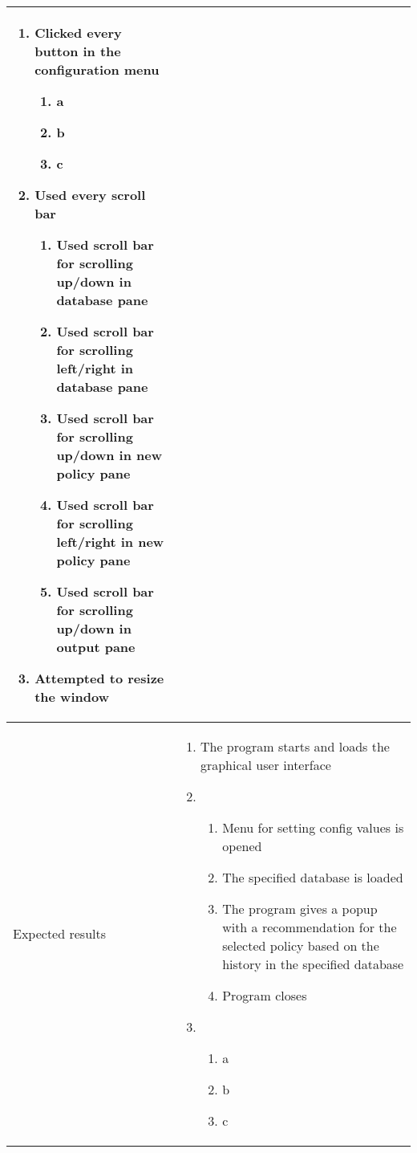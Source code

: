 \begin{center}
\begin{longtable}{ | p{4cm} | p{10cm} | }
\begin{enumerate}
							\item Clicked every button in the configuration menu
							\begin{enumerate}
								\item a
								\item b
								\item c
							\end{enumerate}

							\item Used every scroll bar
							\begin{enumerate}
								\item Used scroll bar for scrolling up/down in database pane
								\item Used scroll bar for scrolling left/right in database pane
								\item Used scroll bar for scrolling up/down in new policy pane
								\item Used scroll bar for scrolling left/right in new policy pane
								\item Used scroll bar for scrolling up/down in output pane
							\end{enumerate}

							\item Attempted to resize the window
						\end{enumerate} \\ [3pt] \hline
			
			Expected results &	\begin{enumerate}
							\item The program starts and loads the graphical user interface

							\item  
							\begin{enumerate}
								\item Menu for setting config values is opened
								\item The specified database is loaded
								\item The program gives a popup with a recommendation for the selected policy based on the history in the specified database
								\item Program closes
							\end{enumerate}
							
							\item
							\begin{enumerate}
								\item a
								\item b
								\item c
							\end{enumerate}


\end{enumerate}
\end{longtable}
\end{center}
